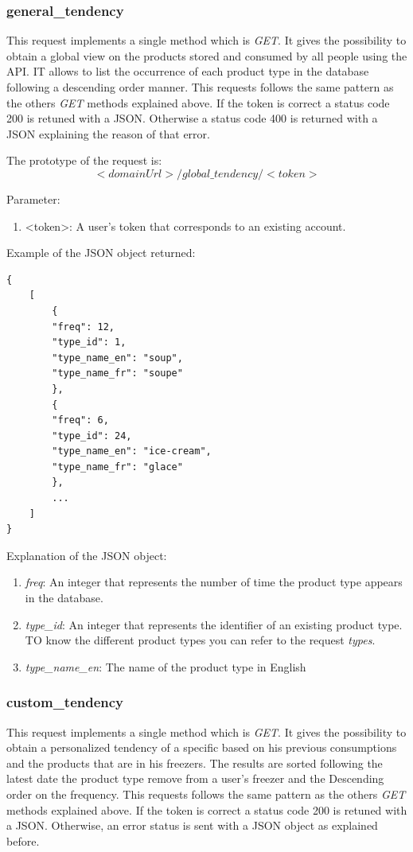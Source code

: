 \subsubsection{general\_tendency}
This request implements a single method which is \textit{GET}. It gives the possibility to obtain a global view on the products stored and consumed by all people using the API. IT allows to list the occurrence of each product type in the database following a descending order manner. This requests follows the same pattern as the others \textit{GET} methods explained above. If the token is correct a status code 200 is retuned with a JSON. Otherwise a status code 400 is returned with a JSON explaining the reason of that error.

The prototype of the request is:
$$<domainUrl>/global\_tendency/<token>$$

Parameter:
\begin{enumerate}
\item <token>: A user's token that corresponds to an existing account.
\end{enumerate}

Example of the JSON object returned:
\begin{lstlisting}
{
    [
        {
        "freq": 12,
        "type_id": 1,
        "type_name_en": "soup",
        "type_name_fr": "soupe"
        },
        {
        "freq": 6,
        "type_id": 24,
        "type_name_en": "ice-cream",
        "type_name_fr": "glace"
        },
        ...
    ]
}
\end{lstlisting}

Explanation of the  JSON object:
\begin{enumerate}
\item \textit{freq}: An integer that represents the number of time the product type appears in the database.
\item \textit{type\_id}: An integer that represents the identifier of an existing product type. TO know the different product types you can refer to the request \textit{types}.
\item \textit{type\_name\_en}: The name of the product type in English
\end{enumerate}

\subsubsection{custom\_tendency}
This request implements a single method which is \textit{GET}. It gives the possibility to obtain a personalized tendency of a specific based on his previous consumptions and the products that are in his freezers. The results are sorted following the latest date the product type remove from a user's freezer and the Descending order on the frequency. This requests follows the same pattern as the others \textit{GET} methods explained above. If the token is correct a status code 200 is retuned with a JSON. Otherwise, an error status is sent with a JSON object as explained before.\\


